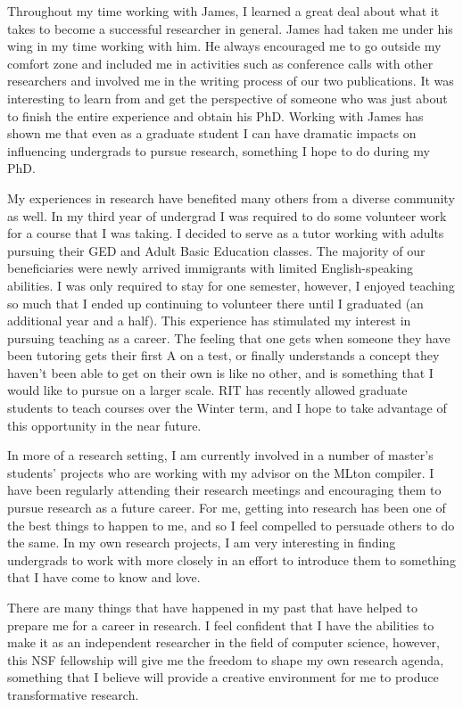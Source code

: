 \documentclass[12pt]{article}
\begin{document}
Throughout my time working with James, I learned a great deal about what it takes to become a successful researcher in general. James had taken me under his wing in my time working with him. He always encouraged me to go outside my comfort zone and included me in activities such as conference calls with other researchers and involved me in the writing process of our two publications. It was interesting to learn from and get the perspective of someone who was just about to finish the entire experience and obtain his PhD.  Working with James has shown me that even as a graduate student I can have dramatic impacts on influencing undergrads to pursue research, something I hope to do during my PhD.

My experiences in research have benefited many others from a diverse community as well. In my third year of undergrad I was required to do some volunteer work for a course that I was taking. I decided to serve as a tutor working with adults pursuing their GED and Adult Basic Education classes. The majority of our beneficiaries were newly arrived immigrants with limited English-speaking abilities. I was only required to stay for one semester, however, I enjoyed teaching so much that I ended up continuing to volunteer there until I graduated (an additional year and a half). This experience has stimulated my interest in pursuing teaching as a career. The feeling that one gets when someone they have been tutoring gets their first A on a test, or finally understands a concept they haven't been able to get on their own is like no other, and is something that I would like to pursue on a larger scale.  RIT has recently allowed graduate students to teach courses over the Winter term, and I hope to take advantage of this opportunity in the near future.  

In more of a research setting, I am currently involved in a number of master's students' projects who are working with my advisor on the MLton compiler.  I have been regularly attending their research meetings and encouraging them to pursue research as a future career.  For me, getting into research has been one of the best things to happen to me, and so I feel compelled to persuade others to do the same. In my own research projects, I am very interesting in finding undergrads to work with more closely in an effort to introduce them to something that I have come to know and love.

There are many things that have happened in my past that have helped to prepare me for a career in research. I feel confident that I have the abilities to make it as an independent researcher in the field of computer science, however, this NSF fellowship will give me the freedom to shape my own research agenda, something that I believe will provide a creative environment for me to produce transformative research.
\vspace{-.5em}
\end{document}
